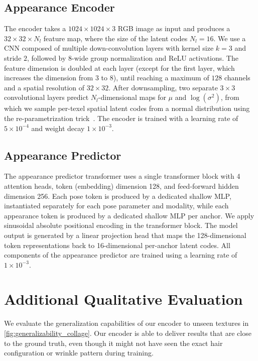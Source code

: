 \documentclass[runningheads]{llncs}
\begin{document}
\subsection{Appearance Encoder}

The encoder takes a $1024{\times}1024{\times}3$ RGB image as input and produces a $32{\times}32{\times}N_l$ feature map, where the size of the latent codes $N_l=16$.
We use a CNN composed of multiple down-convolution layers with kernel size $k=3$ and stride $2$, followed by 8-wide group normalization and ReLU activations.
The feature dimension is doubled at each layer (except for the first layer, which increases the dimension from $3$ to $8$), until reaching a maximum of $128$ channels and a spatial resolution of $32{\times}32$.
After downsampling, two separate $3{\times}3$ convolutional layers predict $N_l$-dimensional maps for $\mu$ and $\log(\sigma^2)$, from which we sample per-texel spatial latent codes from a normal distribution using the re-parametrization trick~\cite{kingma2013auto}.
The encoder is trained with a learning rate of $5{\times}10^{-4}$ and weight decay $1{\times}10^{-3}$.

\subsection{Appearance Predictor}

The appearance predictor transformer uses a single transformer block with 4 attention heads, token (embedding) dimension 128, and feed-forward hidden dimension 256.
Each pose token is produced by a dedicated shallow MLP, instantiated separately for each pose parameter and modality, while each appearance token is produced by a dedicated shallow MLP per anchor.
We apply sinusoidal absolute positional encoding in the transformer block.
The model output is generated by a linear projection head that maps the 128-dimensional token representations back to 16-dimensional per-anchor latent codes.
All components of the appearance predictor are trained using a learning rate of $1{\times}10^{-3}$.

\section{Additional Qualitative Evaluation}

We evaluate the generalization capabilities of our encoder to unseen textures in \cref{fig:generalizability_collage}.
Our encoder is able to deliver results that are close to the ground truth, even though it might not have seen the exact hair configuration or wrinkle pattern during training.
\end{document}
